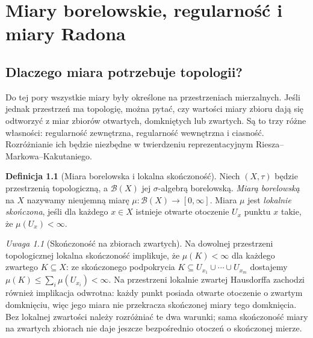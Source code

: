\documentclass[11pt,a4paper,oneside]{book}
\numberwithin{equation}{chapter}
\theoremstyle{plain}
\theoremstyle{definition}
\newtheorem{definicja}[twierdzenie]{Definicja}
\theoremstyle{remark}
\newtheorem{uwaga}[twierdzenie]{Uwaga}
\begin{document}


\chapter{Miary borelowskie, regularność i miary Radona}
\label{ch:radon-measures-20}

\section{Dlaczego miara potrzebuje topologii?}
Do tej pory wszystkie miary były określone na przestrzeniach
mierzalnych. Jeśli jednak przestrzeń ma topologię, można pytać,
czy wartości miary zbioru dają się odtworzyć z miar zbiorów
otwartych, domkniętych lub zwartych. Są to trzy różne własności:
regularność zewnętrzna, regularność wewnętrzna i ciasność.
Rozróżnianie ich będzie niezbędne w twierdzeniu reprezentacyjnym
Riesza--Markowa--Kakutaniego.

\begin{definicja}[Miara borelowska i lokalna skończoność]
\label{def:borel-locfinite-20}
Niech $(X,\tau)$ będzie przestrzenią topologiczną,
a $\mathcal B(X)$ jej $\sigma$-algebrą borelowską.
\emph{Miarą borelowską} na $X$ nazywamy nieujemną miarę
$\mu:\mathcal B(X)\to[0,\infty]$.
Miara $\mu$ jest \emph{lokalnie skończona}, jeśli dla
każdego $x\in X$ istnieje otwarte otoczenie $U_x$ punktu $x$
takie, że $\mu(U_x)<\infty$.
\end{definicja}

\begin{uwaga}[Skończoność na zbiorach zwartych]
\label{rem:compact-finiteness-20}
Na dowolnej przestrzeni topologicznej lokalna skończoność
implikuje, że $\mu(K)<\infty$ dla każdego zwartego
$K\subseteq X$: ze skończonego podpokrycia
$K\subseteq U_{x_1}\cup\cdots\cup U_{x_m}$ dostajemy
$\mu(K)\le\sum_i\mu(U_{x_i})<\infty$.
Na przestrzeni lokalnie zwartej Hausdorffa zachodzi
również implikacja odwrotna: każdy punkt posiada otwarte
otoczenie o zwartym domknięciu, więc jego miara nie
przekracza skończonej miary tego domknięcia.
Bez lokalnej zwartości należy rozróżniać te dwa warunki;
sama skończoność miary na zwartych zbiorach nie daje
jeszcze bezpośrednio otoczeń o skończonej mierze.
\end{uwaga}
\end{document}
